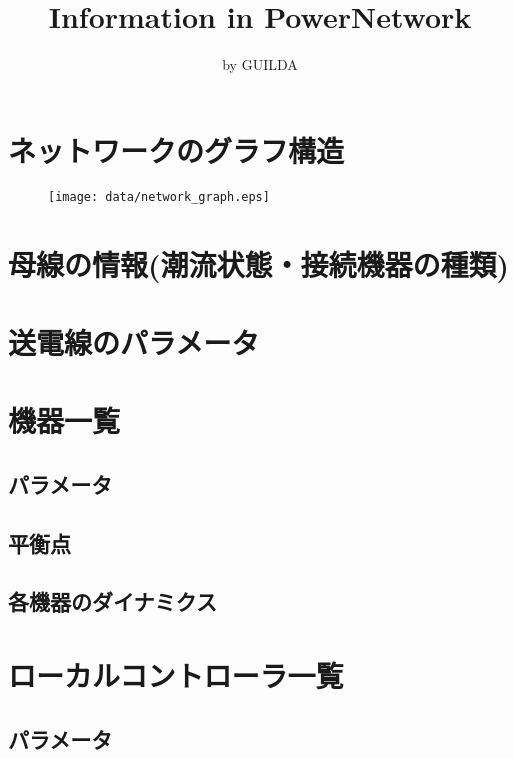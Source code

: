 \documentclass[landscape]{report}
\title{Information in PowerNetwork}
\author{by GUILDA}
\begin{document}
\maketitle{}
\section{ネットワークのグラフ構造}

 \begin{figure}[H]
 \begin{center}
 \texttt{[image: data/network\_graph.eps]}
 \end{center}
 \end{figure}
 \newpage

\section{母線の情報(潮流状態・接続機器の種類)}


\section{送電線のパラメータ}


\section{機器一覧}


\subsection{パラメータ}


\subsection{平衡点}


\subsection{各機器のダイナミクス}



\section{ローカルコントローラ一覧}


\subsection{パラメータ}

\end{document}

